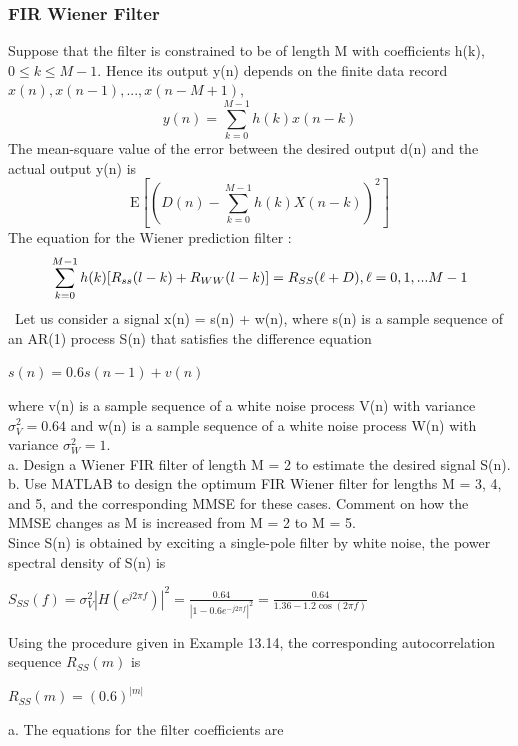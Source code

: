 \documentclass{article}
\begin{document}
\subsubsection{FIR Wiener Filter}
Suppose that the filter is constrained to be of length M with coefficients
h(k), $0 \leq k \leq M-1$. Hence its output y(n) depends on the finite data
record $x(n), x(n-1),...,x(n-M+1),$
\begin{equation}
y(n) = \sum_{k=0}^{M-1}h(k)x(n-k)
\end{equation}
The mean-square value of the error between the desired output d(n) and
the actual output y(n) is
\[
\mathrm{E} \left[ \left( D(n) - \sum_{k=0}^{M-1} h(k) X(n-k) \right)^2 \right]
\]
The equation for the Wiener prediction filter :
\begin{equation}
\sum_{k=0}^{M-1}h(k)[R_{ss}(l-k)+R_{WW}(l-k)]=R_{SS}(\ell+D), \space \ell = 0,1,...M-1
\end{equation}\
Let us consider a signal x(n) = s(n) + w(n), where s(n) is a sample sequence
of an AR(1) process S(n) that satisfies the difference equation
\begin{center}
$s(n) = 0.6s(n-1)+v(n)$
\end{center}
where v(n) is a sample sequence of a white noise process V(n) with variance $\sigma_V^2=0.64$ and w(n) is a sample sequence of a white noise process W(n) with variance $\sigma^2_W=1$. \\
\vspace{1em}
a. Design a Wiener FIR filter of length M = 2 to estimate the desired signal
S(n). \\
b. Use MATLAB to design the optimum FIR Wiener filter for lengths M = 3, 4,
and 5, and the corresponding MMSE for these cases. Comment on how the
MMSE changes as M is increased from M = 2 to M = 5. \\
\vspace{1em}
Since S(n) is obtained by exciting a single-pole filter by white noise, the power
spectral density of S(n) is 
\begin{center}
$S_{SS}(f) = \sigma_V^2|H(e^{j2\pi f})|^2=\frac{0.64}{|1-0.6e^{-j2\pi f}|^2}=\frac{0.64}{1.36-1.2\cos(2\pi f)}$
\end{center}
Using the procedure given in Example 13.14, the corresponding autocorrelation
sequence $R_{SS}(m)$ is
\begin{center}
$R_{SS}(m)=(0.6)^{|m|}$
\end{center}
a. The equations for the filter coefficients are
\end{document}
